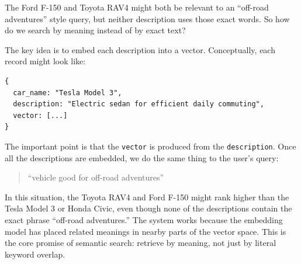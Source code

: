 \documentclass[12pt]{article}
\begin{document}
The Ford F-150 and Toyota RAV4 might both be relevant to an
``off-road adventures'' style query, but neither description uses those
exact words. So how do we search by meaning instead of by exact text?

The key idea is to embed each description into a vector. Conceptually,
each record might look like:

\begin{verbatim}
{
  car_name: "Tesla Model 3",
  description: "Electric sedan for efficient daily commuting",
  vector: [...] 
}
\end{verbatim}

The important point is that the \texttt{vector} is produced from the
\texttt{description}. Once all the descriptions are embedded, we do the
same thing to the user's query:

\begin{quote}
``vehicle good for off-road adventures''
\end{quote}

In this situation, the Toyota RAV4 and Ford F-150 might rank higher than
the Tesla Model 3 or Honda Civic, even though none of the descriptions
contain the exact phrase ``off-road adventures.'' The system works because
the embedding model has placed related meanings in nearby parts of the
vector space. This is the core promise of semantic search: retrieve by
meaning, not just by literal keyword overlap.
\end{document}

